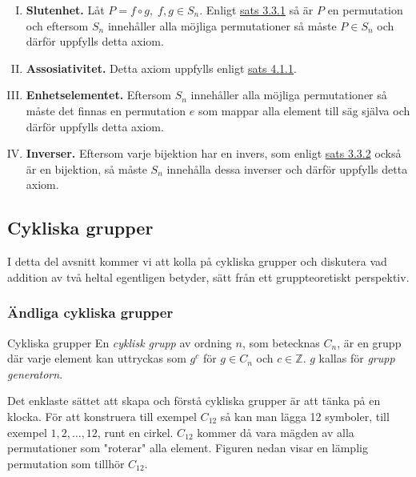 \documentclass{article}
\theoremstyle{definition}
\begin{document}
\begin{enumerate}[I)]
  \item \textbf{Slutenhet.} Låt $P = f \circ g, \; f, g \in S_n$. 
  Enligt \hyperlink{kompbij}{sats 3.3.1} så är $P$ en permutation
  och eftersom $S_n$ innehåller alla möjliga permutationer så måste $P \in S_n$ och därför 
  uppfylls detta axiom. %
  \item \textbf{Assosiativitet.} Detta axiom uppfylls enligt \hyperlink{ass}{sats 4.1.1}.
  \item \textbf{Enhetselementet.} Eftersom $S_n$ innehåller alla möjliga permutationer 
  så måste det finnas en permutation $e$ som mappar alla element till säg själva och 
  därför uppfylls detta axiom. 
  \item \textbf{Inverser.} Eftersom varje bijektion har en invers, 
  som enligt \hyperlink{invbij}{sats 3.3.2} också är en bijektion, så måste 
  $S_n$ innehålla dessa inverser och därför uppfylls detta axiom.
\end{enumerate}

\subsection{Cykliska grupper}
I detta del avsnitt kommer vi att kolla på cykliska grupper 
och diskutera vad addition av två heltal egentligen betyder, sätt från ett gruppteoretiskt 
perspektiv.


\subsubsection{Ändliga cykliska grupper}
\begin{mydef}{Cykliska grupper}{}
  En \textit{cyklisk grupp} av ordning $n$, som betecknas $C_n$, är en grupp där varje element 
  kan uttryckas som $g^c$ för $g \in C_n$ och $c \in \mathbb{Z}.$ $g$ kallas för 
  \textit{grupp generatorn}. 
\end{mydef}
Det enklaste sättet att skapa och förstå cykliska grupper är att tänka på en klocka. 
För att konstruera till exempel $C_{12}$ så kan man lägga 12 symboler, till exempel 
$1, 2, \ldots, 12$, runt en cirkel. $C_{12}$ kommer då vara mägden av alla permutationer 
som "roterar" alla element. Figuren nedan visar en lämplig permutation som tillhör $C_{12}.$
\end{document}

